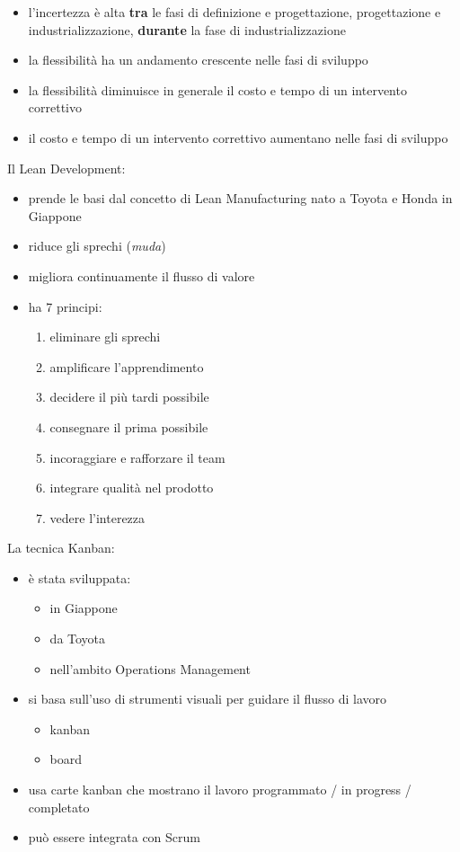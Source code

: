\documentclass[answers, a4paper, 11pt]{exam}
\begin{document}
\begin{itemize}
    \item l'incertezza è alta \textbf{tra} le fasi di definizione e progettazione, progettazione e industrializzazione, \textbf{durante} la fase di industrializzazione
    \item la flessibilità ha un andamento crescente nelle fasi di sviluppo
    \item la flessibilità diminuisce in generale il costo e tempo di un intervento correttivo
    \item il costo e tempo di un intervento correttivo aumentano nelle fasi di sviluppo
\end{itemize}

Il Lean Development:

\begin{itemize}
    \item prende le basi dal concetto di Lean Manufacturing nato a Toyota e Honda in Giappone
    \item riduce gli sprechi (\emph{muda})
    \item migliora continuamente il flusso di valore
    \item ha 7 principi:
    \begin{enumerate}
        \item eliminare gli sprechi
        \item amplificare l'apprendimento
        \item decidere il più tardi possibile
        \item consegnare il prima possibile
        \item incoraggiare e rafforzare il team
        \item integrare qualità nel prodotto
        \item vedere l'interezza
    \end{enumerate}
\end{itemize}

La tecnica Kanban:

\begin{itemize}
    \item è stata sviluppata:
    \begin{itemize}
        \item in Giappone
        \item da Toyota
        \item nell'ambito Operations Management
    \end{itemize}
    \item si basa sull'uso di strumenti visuali per guidare il flusso di lavoro
    \begin{itemize}
        \item kanban
        \item board
    \end{itemize}
    \item usa carte kanban che mostrano il lavoro programmato / in progress / completato
    \item può essere integrata con Scrum
\end{itemize}
\end{document}
